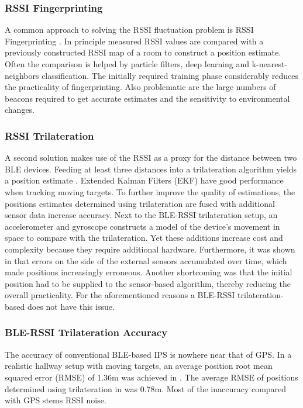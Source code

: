 \documentclass[a4paper, oneside]{ipsreport}
\begin{document}
\subsubsection{RSSI Fingerprinting}
A common approach to solving the RSSI fluctuation problem is RSSI Fingerprinting \cite{Fingerprinting}. In principle measured RSSI values are compared with a previously constructed RSSI map of a room to construct a position estimate. Often the comparison is helped by particle filters, deep learning and k-nearest-neighbors classification. The initially required training phase considerably reduces the practicality of fingerprinting. Also problematic are the large numbers of beacons required to get accurate estimates and the sensitivity to environmental changes.

\subsubsection{RSSI Trilateration}
A second solution makes use of the RSSI as a proxy for the distance between two BLE devices. Feeding at least three distances into a trilateration algorithm yields a position estimate \cite{BLE}. Extended Kalman Filters (EKF) have good performance when tracking moving targets. To further improve the quality of estimations, the positions estimates determined using trilateration are fused with additional sensor data increase accuracy. Next to the BLE-RSSI trilateration setup, an accelerometer and gyroscope constructs a model of the device's movement in space to compare with the trilateration. Yet these additions increase cost and complexity because they require additional hardware. Furthermore, it was shown in \cite{ImuTrilaterationFusion} that errors on the side of the external sensors accumulated over time, which made positions increasingly erroneous. Another shortcoming was that the initial position had to be supplied to the sensor-based algorithm, thereby reducing the overall practicality. For the aforementioned reasons a BLE-RSSI trilateration-based does not have this issue.

\subsubsection{BLE-RSSI Trilateration Accuracy}
The accuracy of conventional BLE-based IPS is nowhere near that of GPS. In a realistic hallway setup with moving targets, an average position root mean squared error (RMSE) of 1.36m was achieved in \cite{AntennaDiversity}. The average RMSE of positions determined using trilateration in \cite{ImuTrilaterationFusion} was 0.78m. Most of the inaccuracy compared with GPS stems RSSI noise.
\end{document}
